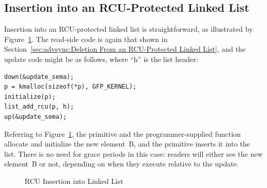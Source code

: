 \subsection{Insertion into an RCU-Protected Linked List}
\label{sec:advsync:Insertion into an RCU-Protected Linked List}

Insertion into an RCU-protected linked list is straightforward, as
illustrated by
Figure~\ref{fig:advsync:RCU Insertion into Linked List}.
The read-side code is again that shown in
Section~\ref{sec:advsync:Deletion From an RCU-Protected Linked List},
and the update code might be as follows, where ``h'' is the list header:

\vspace{5pt}
\begin{minipage}[t]{\columnwidth}
\begin{verbatim}
down(&update_sema);
p = kmalloc(sizeof(*p), GFP_KERNEL);
initialize(p);
list_add_rcu(p, h);
up(&update_sema);
\end{verbatim}
\end{minipage}
\vspace{5pt}

Referring to
Figure~\ref{fig:advsync:RCU Insertion into Linked List},
the  primitive and the programmer-supplied 
function allocate and initialize the new element~B,
and the  primitive inserts it into the list.
There is no need for grace periods in this case: readers will either
see the new element~B or not, depending on when they execute relative
to the update.

\begin{figure}[htb]
\begin{center}
\end{center}
\caption{RCU Insertion into Linked List}
\label{fig:advsync:RCU Insertion into Linked List}
\end{figure}

